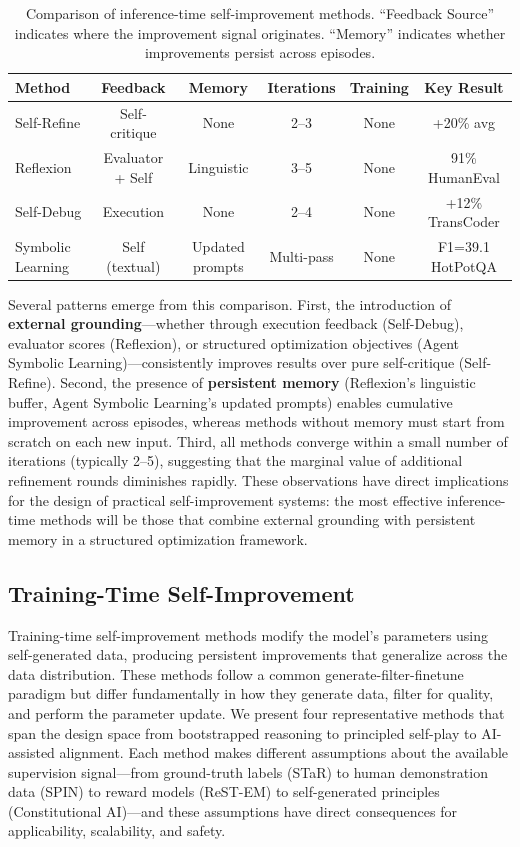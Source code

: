 \begin{table}[t]
\centering
\caption{Comparison of inference-time self-improvement methods. ``Feedback Source'' indicates where the improvement signal originates. ``Memory'' indicates whether improvements persist across episodes.}
\label{tab:inference-comparison}
\small
\begin{tabular}{@{}lccccc@{}}
\toprule
\textbf{Method} & \textbf{Feedback} & \textbf{Memory} & \textbf{Iterations} & \textbf{Training} & \textbf{Key Result} \\
\midrule
Self-Refine & Self-critique & None & 2--3 & None & +20\% avg \\
Reflexion & Evaluator + Self & Linguistic & 3--5 & None & 91\% HumanEval \\
Self-Debug & Execution & None & 2--4 & None & +12\% TransCoder \\
Symbolic Learning & Self (textual) & Updated prompts & Multi-pass & None & F1=39.1 HotPotQA \\
\bottomrule
\end{tabular}
\end{table}

Several patterns emerge from this comparison. First, the introduction of \textbf{external grounding}---whether through execution feedback (Self-Debug), evaluator scores (Reflexion), or structured optimization objectives (Agent Symbolic Learning)---consistently improves results over pure self-critique (Self-Refine). Second, the presence of \textbf{persistent memory} (Reflexion's linguistic buffer, Agent Symbolic Learning's updated prompts) enables cumulative improvement across episodes, whereas methods without memory must start from scratch on each new input. Third, all methods converge within a small number of iterations (typically 2--5), suggesting that the marginal value of additional refinement rounds diminishes rapidly. These observations have direct implications for the design of practical self-improvement systems: the most effective inference-time methods will be those that combine external grounding with persistent memory in a structured optimization framework.


\subsection{Training-Time Self-Improvement}
\label{sec:training-time}

Training-time self-improvement methods modify the model's parameters using self-generated data, producing persistent improvements that generalize across the data distribution. These methods follow a common generate-filter-finetune paradigm but differ fundamentally in how they generate data, filter for quality, and perform the parameter update. We present four representative methods that span the design space from bootstrapped reasoning to principled self-play to AI-assisted alignment. Each method makes different assumptions about the available supervision signal---from ground-truth labels (STaR) to human demonstration data (SPIN) to reward models (ReST-EM) to self-generated principles (Constitutional AI)---and these assumptions have direct consequences for applicability, scalability, and safety.


